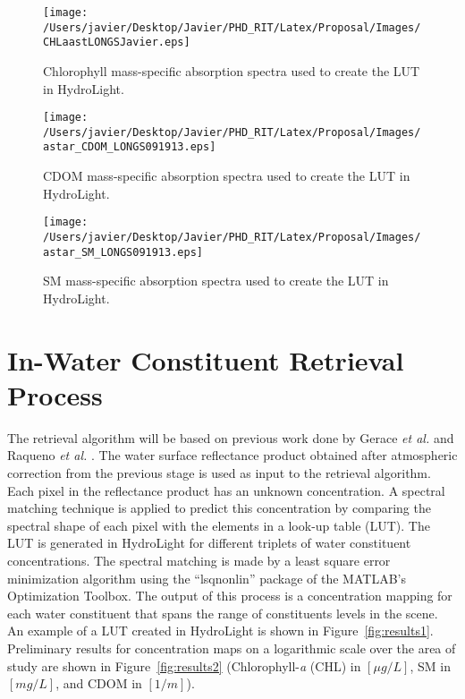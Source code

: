 \begin{figure}[htb]
  	\centering
  	\texttt{[image: /Users/javier/Desktop/Javier/PHD\_RIT/Latex/Proposal/Images/CHLaastLONGSJavier.eps]}
  \caption{Chlorophyll mass-specific absorption spectra used to create the LUT in HydroLight. \label{fig:CHLaastLONGS} } 
\end{figure}


\begin{figure}[htb]
  	\centering
  	\texttt{[image: /Users/javier/Desktop/Javier/PHD\_RIT/Latex/Proposal/Images/astar\_CDOM\_LONGS091913.eps]}
  \caption{CDOM mass-specific absorption spectra used to create the LUT in HydroLight. \label{fig:CDOMaastLONGS} } 
\end{figure}

\begin{figure}[htb]
  	\centering
  	\texttt{[image: /Users/javier/Desktop/Javier/PHD\_RIT/Latex/Proposal/Images/astar\_SM\_LONGS091913.eps]}
  \caption{SM mass-specific absorption spectra used to create the LUT in HydroLight. \label{fig:SMaastLONGS} } 
\end{figure}

\section{In-Water Constituent Retrieval Process}
\label{sec:retrieval}
The retrieval algorithm will be based on previous work done by Gerace {\it et al.} \cite{Gerace:2013} and Raqueno {\it et al.} \cite{Raqueno:2000}. The water surface reflectance product obtained after atmospheric correction from the previous stage is used as input to the retrieval algorithm. Each pixel in the reflectance product has an unknown concentration. A spectral matching technique is applied to predict this concentration by comparing the spectral shape of each pixel with the elements in a look-up table (LUT). The LUT is generated in HydroLight \cite{MobleyHE} for different triplets of water constituent concentrations. The spectral matching is made by a least square error minimization algorithm using the ``lsqnonlin'' package of the MATLAB's Optimization Toolbox. The output of this process is a concentration mapping for each water constituent that spans the range of constituents levels in the scene. An example of a LUT created in HydroLight is shown in Figure~\ref{fig:results1}. Preliminary results for concentration maps on a logarithmic scale over the area of study are shown in Figure~\ref{fig:results2} (Chlorophyll-{\it a} (CHL) in $[\mu g/L]$, SM in $[mg/L]$, and CDOM in $[1/m]$).

